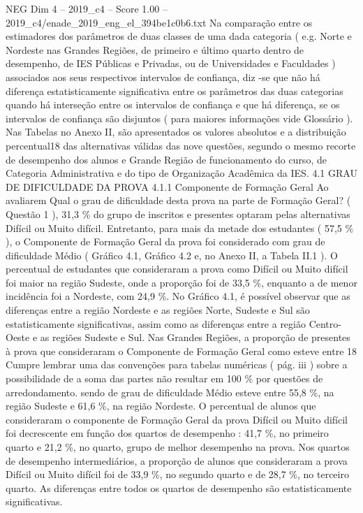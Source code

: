 \begin{textsample}{NEG Dim 4 – 2019\_c4 – Score 1.00 – 2019\_c4/enade\_2019\_eng\_el\_394be1c0b6.txt}
Na comparação entre os estimadores dos parâmetros de duas classes de uma dada categoria ( e.g.
Norte e Nordeste nas Grandes Regiões, de primeiro e último quarto dentro de desempenho, de IES Públicas e Privadas, ou de Universidades e Faculdades ) associados aos seus respectivos intervalos de confiança, diz -se que não há diferença estatisticamente significativa entre os parâmetros das duas categorias quando há interseção entre os intervalos de confiança e que há diferença, se os intervalos de confiança são disjuntos ( para maiores informações vide Glossário ).
Nas Tabelas no Anexo II, são apresentados os valores absolutos e a distribuição percentual18 das alternativas válidas das nove questões, segundo o mesmo recorte de desempenho dos alunos e Grande Região de funcionamento do curso, de Categoria Administrativa e do tipo de Organização Acadêmica da IES. 4.1 GRAU DE DIFICULDADE DA PROVA 4.1.1 Componente de Formação Geral Ao avaliarem Qual o grau de dificuldade desta prova na parte de Formação Geral? ( Questão 1 ), 31,3 \% do grupo de inscritos e presentes optaram pelas alternativas Difícil ou Muito difícil.
Entretanto, para mais da metade dos estudantes ( 57,5 \% ), o Componente de Formação Geral da prova foi considerado com grau de dificuldade Médio ( Gráfico 4.1, Gráfico 4.2 e, no Anexo II, a Tabela II.1 ).
O percentual de estudantes que consideraram a prova como Difícil ou Muito difícil foi maior na região Sudeste, onde a proporção foi de 33,5 \%, enquanto a de menor incidência foi a Nordeste, com 24,9 \%.
No Gráfico 4.1, é possível observar que as diferenças entre a região Nordeste e as regiões Norte, Sudeste e Sul são estatisticamente significativas, assim como as diferenças entre a região Centro-Oeste e as regiões Sudeste e Sul.
Nas Grandes Regiões, a proporção de presentes à prova que consideraram o Componente de Formação Geral como esteve entre 18 Cumpre lembrar uma das convenções para tabelas numéricas ( pág. iii ) sobre a possibilidade de a soma das partes não resultar em 100 \% por questões de arredondamento. sendo de grau de dificuldade Médio esteve entre 55,8 \%, na região Sudeste e 61,6 \%, na região Nordeste.
O percentual de alunos que consideraram o componente de Formação Geral da prova Difícil ou Muito difícil foi decrescente em função dos quartos de desempenho : 41,7 \%, no primeiro quarto e 21,2 \%, no quarto, grupo de melhor desempenho na prova.
Nos quartos de desempenho intermediários, a proporção de alunos que consideraram a prova Difícil ou Muito difícil foi de 33,9 \%, no segundo quarto e de 28,7 \%, no terceiro quarto.
As diferenças entre todos os quartos de desempenho são estatisticamente significativas.

\end{textsample}
